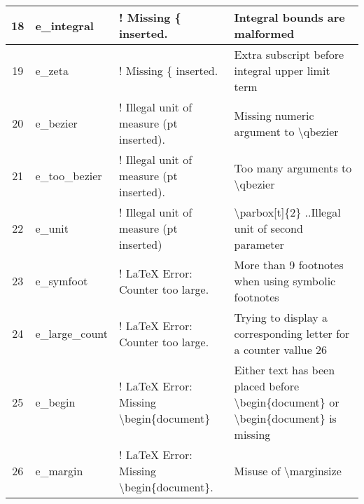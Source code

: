 \documentclass[cn,10pt,math=newtx,citestyle=gb7714-2015,bibstyle=gb7714-2015]{elegantbook}
\begin{document}
\begin{sidewaystable}
\begin{tabular}{|c|l|l|l|}
		\hline
		18 & e\_integral                & ! Missing \{ inserted.                                        & Integral bounds are malformed                                                                                                \\ 
		\hline
		19 & e\_zeta                    & ! Missing \{ inserted.                                        & Extra subscript before integral upper limit term                                                                             \\ 
		\hline
		20 & e\_bezier                  & ! Illegal unit of measure (pt inserted).                      & Missing numeric argument to \textbackslash{}qbezier                                                                          \\ 
		\hline
		21 & e\_too\_bezier             & ! Illegal unit of measure (pt inserted).                      & Too many arguments to \textbackslash{}qbezier                                                                                \\ 
		\hline
		22 & e\_unit                    & ! Illegal unit of measure (pt inserted)                       & \textbackslash{}parbox[t]\{2\} ..Illegal unit of second parameter                                                            \\ 
		\hline
		23 & e\_symfoot                 & ! LaTeX Error: Counter too large.                             & More than 9 footnotes when using symbolic footnotes                                                                          \\ 
		\hline
		24 & e\_large\_count            & ! LaTeX Error: Counter too large.                             & Trying to display a corresponding letter for a counter vallue 26                                                             \\ 
		\hline
		25 & e\_begin                   & ! LaTeX Error: Missing \textbackslash{}begin\{document\}      & Either text has been placed before \textbackslash{}begin\{document\} or 
		\textbackslash{}begin\{document\} is missing  \\ 
		\hline
		26 & e\_margin                  & ! LaTeX Error: Missing \textbackslash{}begin\{document\}.     & Misuse of \textbackslash{}marginsize                                                                                         \\
		\hline
	\end{tabular}
\end{sidewaystable}
\end{document}
